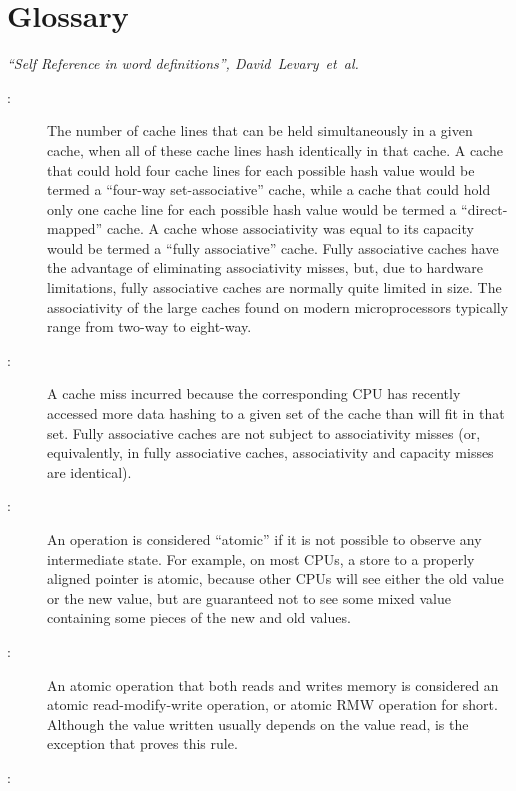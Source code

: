 
\chapter{Glossary}
%
	 {\emph{``Self Reference in word definitions'',
	        David~Levary~et~al.}}

\begin{description}
\item[:]
	The number of cache lines that can be held simultaneously in
	a given cache, when all of these cache lines hash identically
	in that cache.
	A cache that could hold four cache lines for each possible
	hash value would be termed a ``four-way set-associative'' cache,
	while a cache that could hold only one cache line for each
	possible hash value would be termed a ``direct-mapped'' cache.
	A cache whose associativity was equal to its capacity would
	be termed a ``fully associative'' cache.
	Fully associative caches have the advantage of eliminating
	associativity misses, but, due to hardware limitations,
	fully associative caches are normally quite limited in size.
	The associativity of the large caches found on modern microprocessors
	typically range from two-way to eight-way.
\item[:]
	A cache miss incurred because the corresponding CPU has recently
	accessed more data hashing to a given set of the cache than will
	fit in that set.
	Fully associative caches are not subject to associativity misses
	(or, equivalently, in fully associative caches, associativity
	and capacity misses are identical).
\item[:]
	An operation is considered ``atomic'' if it is not possible to
	observe any intermediate state.
	For example, on most CPUs, a store to a properly aligned pointer
	is atomic, because other CPUs will see either the old value or
	the new value, but are guaranteed not to see some mixed value
	containing some pieces of the new and old values.
\item[:]
	An atomic operation that both reads and writes memory is
	considered an atomic read-modify-write operation, or atomic RMW
	operation for short.
	Although the value written usually depends on the value read,
	 is the exception that proves this rule.
\item[:]

\end{description}
